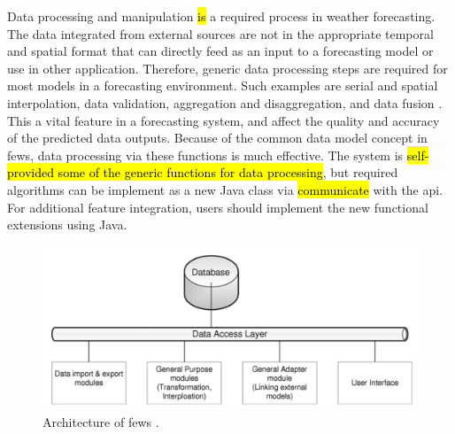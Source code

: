 Data processing and manipulation \hl{is} a required process in weather forecasting. 
The data integrated from external sources are not in the appropriate temporal and spatial format that can directly feed as an input to a forecasting model or use in other application. Therefore, generic data processing steps are required for most models in a forecasting environment. Such examples are serial and spatial interpolation, data validation, aggregation and disaggregation, and data fusion \cite{Werner2013TheSystem}. This a vital feature in a forecasting system, and affect the quality and accuracy of the predicted data outputs. Because of the common data model concept in \acrshort{fews}, data processing via these functions is much effective. The system is \hl{self-provided some of the generic functions for data processing}, but required algorithms can be implement as a new Java class via \hl{communicate} with the \acrfull{api}. %
For additional feature integration, users should implement the new functional extensions using Java. %

\begin{figure}[htp]
    \centering
    \includegraphics[width=1.0\textwidth]{lit/fews/Architecture-of-Delft-FEWS-showing-the-data-base-the-data-access-layers-and-examples-of_W640.png}
    \caption[Architecture of \acrshort{fews}]{Architecture of \acrshort{fews} \cite{Werner2013TheSystem}.}
    \label{fi:fews_data_layer}
\end{figure}

